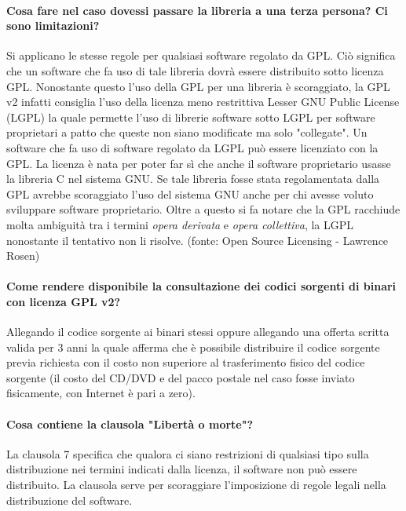 \documentclass[a4paper]{article}
\begin{document}
			\paragraph{Cosa fare nel caso dovessi passare la libreria a una terza persona? Ci sono limitazioni?}
				Si applicano le stesse regole per qualsiasi software regolato da GPL. Ciò significa che un software che fa uso di tale libreria dovrà essere distribuito sotto licenza GPL.
				Nonostante questo l'uso della GPL per una libreria è scoraggiato, la GPL v2 infatti consiglia l'uso della licenza meno restrittiva Lesser GNU Public License (LGPL) la quale permette l'uso di librerie software sotto LGPL per software proprietari a patto che queste non siano modificate ma solo "collegate". Un software che fa uso di software regolato da LGPL può essere licenziato con la GPL.
				La licenza è nata per poter far sì che anche il software proprietario usasse la libreria C nel sistema GNU. Se tale libreria fosse stata regolamentata dalla GPL avrebbe scoraggiato l'uso del sistema GNU anche per chi avesse voluto sviluppare software proprietario. Oltre a questo si fa notare che la GPL racchiude molta ambiguità tra i termini \textit{opera derivata} e \textit{opera collettiva}, la LGPL nonostante il tentativo non li risolve. (fonte: Open Source Licensing - Lawrence Rosen)
				
			
			\paragraph{Come rendere disponibile la consultazione dei codici sorgenti di binari con licenza GPL v2?} %
			Allegando il codice sorgente ai binari stessi oppure allegando una offerta scritta valida per 3 anni la quale afferma che è possibile distribuire il codice sorgente previa richiesta con il costo non superiore al trasferimento fisico del codice sorgente (il costo del CD/DVD e del pacco postale nel caso fosse inviato fisicamente, con Internet è pari a zero).
			
			\paragraph{Cosa contiene la clausola "Libertà o morte"?}
				La clausola 7 specifica che qualora ci siano restrizioni di qualsiasi tipo sulla distribuzione nei termini indicati dalla licenza, il software non può essere distribuito. La clausola serve per scoraggiare l'imposizione di regole legali nella distribuzione del software.
		
\end{document}
